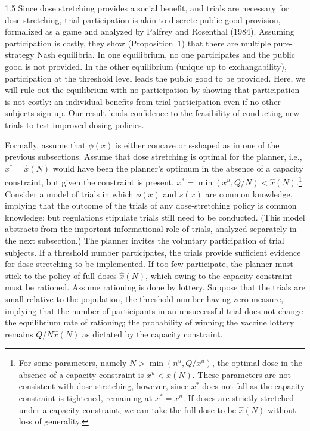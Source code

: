 \documentclass[12pt]{article}
\newcommand{\efficacy}{\phi}
\newcommand{\side}{s}
\newcommand{\xh}{\hat{x}}
\begin{document}
\begin{spacing}{1.5}
Since dose stretching provides a social benefit, and trials are necessary for dose stretching, trial participation is akin to discrete public good provision, formalized as a game and analyzed by Palfrey and Rosenthal (1984). Assuming participation is costly, they show (Proposition~1) that there are multiple pure-strategy Nash equilibria. In one equilibrium, no one participates and the public good is not provided. In the other equilibrium (unique up to exchangability), participation at the threshold level leads the public good to be provided. Here, we will rule out the equilibrium with no participation by showing that participation is not costly: an individual benefits from trial participation even if no other subjects sign up. Our result lends confidence to the feasibility of conducting new trials to test improved dosing policies.

Formally, assume that $\efficacy(x)$ is either concave or s-shaped as in one of the previous subsections. Assume that dose stretching is optimal for the planner, i.e., $x^* = \xh(N)$ would have been the planner's optimum in the absence of a capacity constraint, but given the constraint is present, $x^* = \min(x^u, Q/N) < \xh(N)$.\footnote{For some parameters, namely $N > \min(n^u, Q/x^u)$, the optimal dose in the absence of a capacity constraint is $x^u < \xh(N)$. These parameters are not consistent with dose stretching, however, since $x^*$ does not fall as the capacity constraint is tightened, remaining at $x^* = x^u$. If doses are strictly stretched under a capacity constraint, we can take the full dose to be $\xh(N)$ without loss of generality.} Consider a model of trials in which $\efficacy(x)$ and $\side(x)$ are common knowledge, implying that the outcome of the trials of any dose-stretching policy is common knowledge; but regulations stipulate trials still need to be conducted. (This model abstracts from the important informational role of trials, analyzed separately in the next subsection.) The planner invites the voluntary participation of trial subjects. If a threshold number participates, the trials provide sufficient evidence for dose stretching to be implemented. If too few participate, the planner must stick to the policy of full doses $\xh(N)$, which owing to the capacity constraint must be rationed. Assume rationing is done by lottery. Suppose that the trials are small relative to the population, the threshold number having zero measure, implying that the number of participants in an unsuccessful trial does not change the equilibrium rate of rationing; the probability of winning the vaccine lottery remains $Q / N \xh(N)$ as dictated by the capacity constraint. 


\end{spacing}
\end{document}
